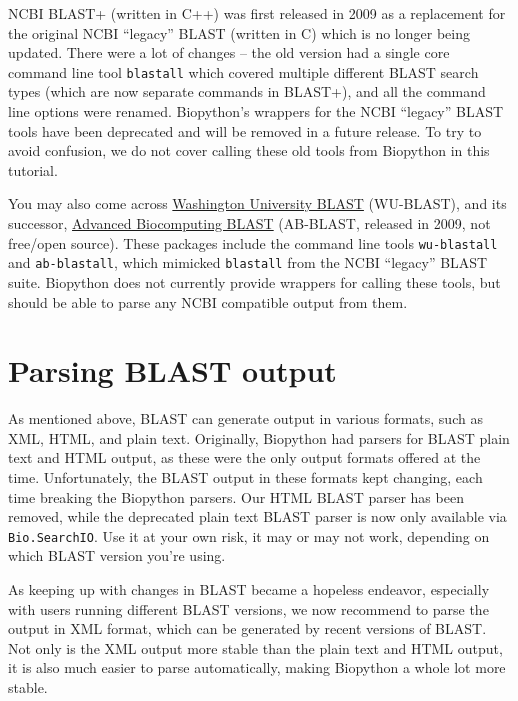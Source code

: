 NCBI BLAST+ (written in C++) was first released in 2009 as a replacement for
the original NCBI ``legacy'' BLAST (written in C) which is no longer being updated.
There were a lot of changes -- the old version had a single core command line
tool \verb|blastall| which covered multiple different BLAST search types (which
are now separate commands in BLAST+), and all the command line options
were renamed.
Biopython's wrappers for the NCBI ``legacy'' BLAST tools have been deprecated
and will be removed in a future release.
To try to avoid confusion, we do not cover calling these old tools from Biopython
in this tutorial.

You may also come across \href{http://blast.wustl.edu/}{Washington University BLAST}
(WU-BLAST), and its successor, \href{https://blast.advbiocomp.com}{Advanced Biocomputing
BLAST} (AB-BLAST, released in 2009, not free/open source). These packages include
the command line tools \verb|wu-blastall| and \verb|ab-blastall|, which mimicked
\verb|blastall| from the NCBI ``legacy'' BLAST suite.
Biopython does not currently provide wrappers for calling these tools, but should be able
to parse any NCBI compatible output from them.

\section{Parsing BLAST output}

As mentioned above, BLAST can generate output in various formats, such as
XML, HTML, and plain text. Originally, Biopython had parsers for BLAST
plain text and HTML output, as these were the only output formats offered
at the time. Unfortunately, the BLAST output in these formats kept changing,
each time breaking the Biopython parsers. Our HTML BLAST parser has been
removed, while the deprecated plain text BLAST parser is now only available
via \verb|Bio.SearchIO|. Use it at your own risk, it may or may not work,
depending on which BLAST version you're using.

As keeping up with changes in BLAST
became a hopeless endeavor, especially with users running different BLAST
versions, we now recommend to parse the output in XML format, which can be
generated by recent versions of BLAST. Not only is the XML output more stable
than the plain text and HTML output, it is also much easier to parse
automatically, making Biopython a whole lot more stable.

